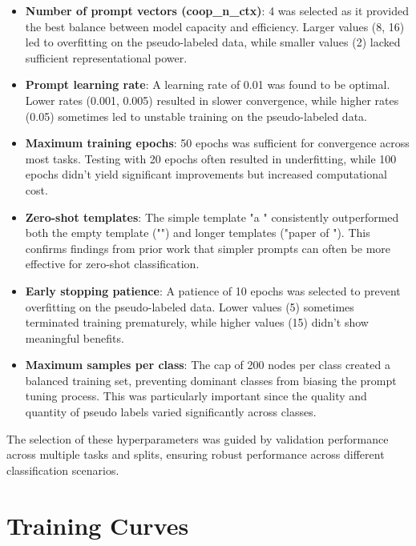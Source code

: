 \documentclass[10pt,conference]{IEEEtran}
\begin{document}
\begin{itemize}
    \item \textbf{Number of prompt vectors (coop\_n\_ctx)}: 4 was selected as it provided the best balance between model capacity and efficiency. Larger values (8, 16) led to overfitting on the pseudo-labeled data, while smaller values (2) lacked sufficient representational power.
    
    \item \textbf{Prompt learning rate}: A learning rate of 0.01 was found to be optimal. Lower rates (0.001, 0.005) resulted in slower convergence, while higher rates (0.05) sometimes led to unstable training on the pseudo-labeled data.
    
    \item \textbf{Maximum training epochs}: 50 epochs was sufficient for convergence across most tasks. Testing with 20 epochs often resulted in underfitting, while 100 epochs didn't yield significant improvements but increased computational cost.
    
    \item \textbf{Zero-shot templates}: The simple template "a " consistently outperformed both the empty template ("") and longer templates ("paper of "). This confirms findings from prior work that simpler prompts can often be more effective for zero-shot classification.
    
    \item \textbf{Early stopping patience}: A patience of 10 epochs was selected to prevent overfitting on the pseudo-labeled data. Lower values (5) sometimes terminated training prematurely, while higher values (15) didn't show meaningful benefits.
    
    \item \textbf{Maximum samples per class}: The cap of 200 nodes per class created a balanced training set, preventing dominant classes from biasing the prompt tuning process. This was particularly important since the quality and quantity of pseudo labels varied significantly across classes.
\end{itemize}

The selection of these hyperparameters was guided by validation performance across multiple tasks and splits, ensuring robust performance across different classification scenarios.

\section{Training Curves}
\end{document}
